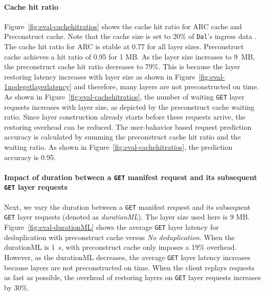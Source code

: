 \paragraph{Cache hit ratio}
Figure~\ref{fig:eval-cachehitratios} shows the cache hit ratio for ARC cache and Preconstruct cache.
Note that the cache size is set to 20\% of \texttt{Dal}'s ingress data .
The cache hit ratio for ARC is stable at 0.77 for all layer sizes.
Preconstruct cache achieves a hit ratio of 0.95 for 1 MB.
As the layer size increases to 9~MB, the preconstruct cache hit ratio decreases to 79\%. 
This is because the layer restoring latency increases with layer size as shown in Figure~\ref{fig:eval-1nodegetlayerlatency} and therefore, many layers are not preconstructed on time.
As shown in Figure~\ref{fig:eval-cachehitratios}, the number of waiting \texttt{GET} layer requests increases with layer size, as depicted by the preconstruct cache waiting ratio.
Since layer construction already starts before these requests arrive, the restoring overhead can be reduced.
The user-bahavior based request prediction accuracy is calculated by summing the preconstruct cache hit ratio and the waiting ratio.
As shown in Figure~\ref{fig:eval-cachehitratios}, the prediction accuracy is 0.95.
 
\paragraph{Impact of duration between a \texttt{GET} manifest request and its subsequent \texttt{GET} layer requests}
Next, we vary the duration between a \texttt{GET} manifest request and its subsequent \texttt{GET} layer requests (denoted as \emph{durationML}).
The layer size used here is 9 MB.
%
Figure~\ref{fig:eval-durationML} shows the average \texttt{GET} layer latency for \sysname deduplication with preconstruct cache versus \emph{No deduplication}.
When the durationML is 1~s, \sysname with preconstruct cache only imposes a 19\% overhead.
However, as the durationML decreases, the average \texttt{GET} layer latency increases because layers are not preconstructed on time.
When the client replays requests as fast as possible, the overhead of restoring layers on \texttt{GET} layer requests increases by 30\%.


